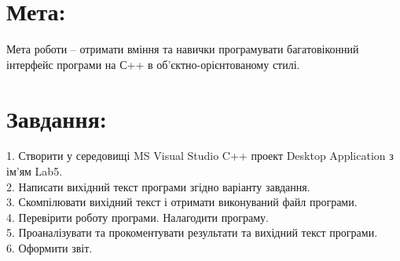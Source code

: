 \documentclass[14pt]{article}
\begin{document}

    \tableofcontents
    \newpage


    \section{Мета:}
    Мета роботи – отримати вміння та навички програмувати багатовіконний інтерфейс програми на С++ в об’єктно-орієнтованому стилі.


    \section{Завдання:}
    1. Створити у середовищі MS Visual Studio C++ проект Desktop Application з ім’ям Lab5. \\
    2. Написати вихідний текст програми згідно варіанту завдання. \\
    3. Скомпілювати вихідний текст і отримати виконуваний файл програми. \\
    4. Перевірити роботу програми. Налагодити програму. \\
    5. Проаналізувати та прокоментувати результати та вихідний текст програми. \\
    6. Оформити звіт. \\
\end{document}
